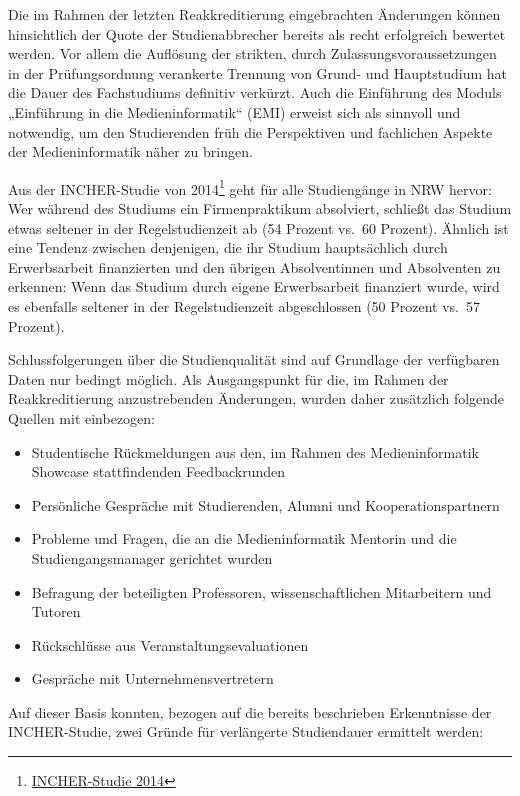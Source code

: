 Die im Rahmen der letzten Reakkreditierung eingebrachten Änderungen
können hinsichtlich der Quote der Studienabbrecher bereits als recht
erfolgreich bewertet werden. Vor allem die Auflösung der strikten, durch
Zulassungsvoraussetzungen in der Prüfungsordnung verankerte Trennung von
Grund- und Hauptstudium hat die Dauer des Fachstudiums definitiv
verkürzt. Auch die Einführung des Moduls „Einführung in die
Medieninformatik`` (EMI) erweist sich als sinnvoll und notwendig, um den
Studierenden früh die Perspektiven und fachlichen Aspekte der
Medieninformatik näher zu bringen.

Aus der INCHER-Studie von 2014\footnote{\href{https://th-koeln.github.io/mi-2017/anhaenge/studie-INCHER-Studie.pdf}{INCHER-Studie
  2014}} geht für alle Studiengänge in NRW hervor: Wer während des
Studiums ein Firmenpraktikum absolviert, schließt das Studium etwas
seltener in der Regelstudienzeit ab (54 Prozent vs.~60 Prozent). Ähnlich
ist eine Tendenz zwischen denjenigen, die ihr Studium hauptsächlich
durch Erwerbsarbeit finanzierten und den übrigen Absolventinnen und
Absolventen zu erkennen: Wenn das Studium durch eigene Erwerbsarbeit
finanziert wurde, wird es ebenfalls seltener in der Regelstudienzeit
abgeschlossen (50 Prozent vs.~57 Prozent).

Schlussfolgerungen über die Studienqualität sind auf Grundlage der
verfügbaren Daten nur bedingt möglich. Als Ausgangspunkt für die, im
Rahmen der Reakkreditierung anzustrebenden Änderungen, wurden daher
zusätzlich folgende Quellen mit einbezogen:

\begin{itemize}
\tightlist
\item
  Studentische Rückmeldungen aus den, im Rahmen des Medieninformatik
  Showcase stattfindenden Feedbackrunden
\item
  Persönliche Gespräche mit Studierenden, Alumni und
  Kooperationspartnern
\item
  Probleme und Fragen, die an die Medieninformatik Mentorin und die
  Studiengangsmanager gerichtet wurden
\item
  Befragung der beteiligten Professoren, wissenschaftlichen Mitarbeitern
  und Tutoren
\item
  Rückschlüsse aus Veranstaltungsevaluationen
\item
  Gespräche mit Unternehmensvertretern
\end{itemize}

Auf dieser Basis konnten, bezogen auf die bereits beschrieben
Erkenntnisse der INCHER-Studie, zwei Gründe für verlängerte Studiendauer
ermittelt werden:

